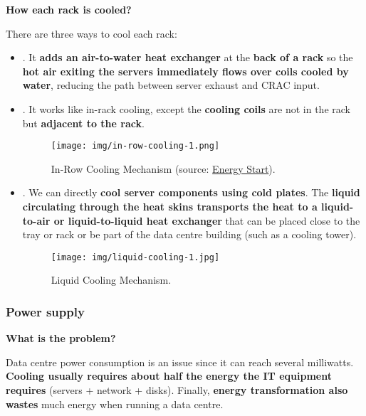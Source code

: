 \begin{flushleft}
	\textcolor{Green3}{ \textbf{How each rack is cooled?}}
\end{flushleft}
There are three ways to cool each rack:
\begin{itemize}
	\item {}. It \textbf{adds an air-to-water heat exchanger} at the \textbf{back of a rack} so the \textbf{hot air exiting the servers immediately flows over coils cooled by water}, reducing the path between server exhaust and CRAC input.
	
	\item {}. It works like in-rack cooling, except the \textbf{cooling coils} are not in the rack but \textbf{adjacent to the rack}.
	\begin{figure}[!htp]
		\centering
		\texttt{[image: img/in-row-cooling-1.png]}
		\caption{In-Row Cooling Mechanism (source: \href{https://www.energystar.gov/products/data_center_equipment/16-more-ways-cut-energy-waste-data-center/install-rack-or-row}{Energy Start}).}
	\end{figure}
	
	
	\item {}. We can directly \textbf{cool server components using cold plates}. The \textbf{liquid circulating through the heat skins transports the heat to a liquid-to-air or liquid-to-liquid heat exchanger} that can be placed close to the tray or rack or be part of the data centre building (such as a cooling tower).
	\begin{figure}[!htp]
		\centering
		\texttt{[image: img/liquid-cooling-1.jpg]}
		\caption{Liquid Cooling Mechanism.}
	\end{figure}
\end{itemize}

\newpage

\subsubsection{Power supply}\label{subsubsection: Power supply}

\begin{flushleft}
	\textcolor{Green3}{ \textbf{What is the problem?}}
\end{flushleft}
Data centre power consumption is an issue since it can reach several milliwatts. \textbf{Cooling usually requires about half the energy the IT equipment requires} (servers + network + disks). Finally, \textbf{energy transformation also wastes} much energy when running a data centre.

